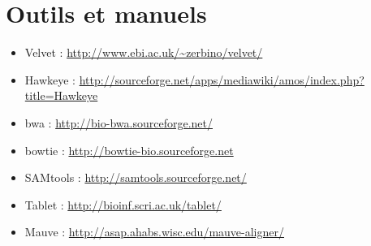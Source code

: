 \documentclass[a4paper,12pt]{article}
\begin{document}
\section{Outils et manuels}

\begin{itemize}
	\item Velvet : \url{http://www.ebi.ac.uk/~zerbino/velvet/}
	\item Hawkeye : \url{http://sourceforge.net/apps/mediawiki/amos/index.php?title=Hawkeye}
	\item bwa : \url{http://bio-bwa.sourceforge.net/}
	\item bowtie : \url{http://bowtie-bio.sourceforge.net}
	\item SAMtools : \url{http://samtools.sourceforge.net/}
	\item Tablet : \url{http://bioinf.scri.ac.uk/tablet/}
	\item Mauve : \url{http://asap.ahabs.wisc.edu/mauve-aligner/}
	
\end{itemize}

{}

\end{document}
